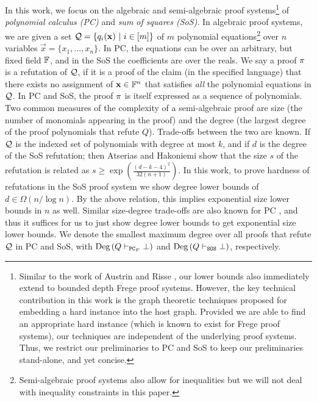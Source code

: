 \documentclass[11pt]{article}
\begin{document}
In this work, we focus on the algebraic and semi-algebraic proof systems\footnote{Similar to the work of Austrin and Risse \citep{Austrin_2022}, our lower bounds also immediately extend to bounded depth Frege proof systems. However, the key technical contribution in this work is the graph theoretic techniques proposed for embedding a hard instance into the host graph.
Provided we are able to find an appropriate hard instance (which is known to exist for Frege proof systems), our techniques are independent of the underlying proof systems.
Thus, we restrict our preliminaries to PC and SoS to keep our preliminaries stand-alone, and yet concise.} of \emph{polynomial calculus (PC)} and \emph{sum of squares (SoS)}. %
In algebraic proof systems, we are given a set $\mathcal{Q} =\{q_i(\mathbf{x}) \text{ } |\text{ } i \in [m] \}$ of $m$ polynomial equations\footnote{Semi-algebraic proof systems also allow for inequalities but we will not deal with inequality constraints in this paper.} over $n$ variables $\vec{x} = \{x_1, \dots, x_n\}$.
In PC, the equations can be over an arbitrary, but fixed field $\mathbb{F}$, and in the SoS the coefficients are  over the reals.
We say a proof $\pi$ is a refutation of $\mathcal{Q}$, if it is a proof of the claim (in the specified language) that there exists no assignment of $\mathbf{x} \in \mathbb{F}^n$ that satisfies \emph{all} the polynomial equations in $\mathcal{Q}$.
In PC and SoS, the proof $\pi$ is itself expressed as a sequence of polynomials.
Two common measures of the complexity of a semi-algebraic proof are size (the number of monomials appearing in the proof) and the degree (the largest degree of the proof polynomials that refute $Q$).
Trade-offs between the two are known.
If $\mathcal{Q}$ is the indexed set of polynomials with degree at most $k$, and if $d$ is the degree of the SoS refutation; then Atserias and Hakoniemi \cite[Corollary 1]{atserias2020Size} show that the size $s$ of the refutation is related as $s \ge \exp\left(\frac{(d-k-4)^2}{32(n+1)}\right)$. 
In this work, to prove hardness of refutations in the SoS proof system we show degree lower bounds of $d \in \Omega(n/\log n)$.
By the above relation, this implies exponential size lower bounds in $n$ as well. 
Similar size-degree trade-offs are also known for PC \cite{impagliazzo1999lower}, and thus it suffices for us to just show degree lower bounds to get exponential size lower bounds.
We denote the smallest maximum degree over all proofs that refute $\mathcal{Q}$ in PC and SoS, with $\text{Deg}\left(Q \vdash_{\texttt{PC}_F} \bot\right)$ and $\text{Deg}\left(Q \vdash_{\texttt{SOS}} \bot\right)$, respectively.
\end{document}
